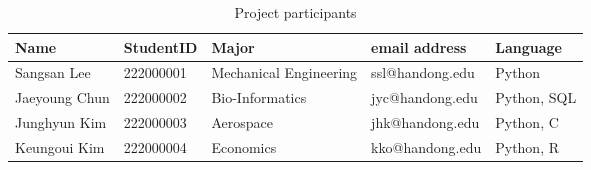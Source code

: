 \begin{longtable}[c]{@{}lllll@{}}
    \caption{Project participants}
    \label{tab:my-table}\\
    \toprule
    Name & StudentID & Major & email address & Language \\* \midrule
    \endfirsthead
    \endhead
    \bottomrule
    \endfoot
    \endlastfoot
    Sangsan Lee & 222000001 & Mechanical Engineering & ssl@handong.edu & Python \\
    Jaeyoung Chun & 222000002 & Bio-Informatics & jyc@handong.edu & Python, SQL \\
    Junghyun Kim & 222000003 & Aerospace & jhk@handong.edu & Python, C \\
    Keungoui Kim & 222000004 & Economics & kko@handong.edu & Python, R \\* \bottomrule
\end{longtable}

